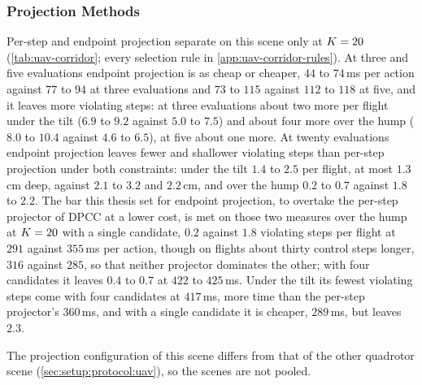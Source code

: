 \subsubsection{Projection Methods}\label{sec:res:uav:projection}
Per-step and endpoint projection separate on this scene only at $K=20$
(\autoref{tab:uav-corridor}; every selection rule in \autoref{app:uav-corridor-rules}). At three and five
evaluations endpoint projection is as cheap or cheaper, $44$ to $74$\,ms per action against $77$ to $94$ at
three evaluations and $73$ to $115$ against $112$ to $118$ at five, and it leaves more violating steps: at
three evaluations about two more per flight under the tilt ($6.9$ to $9.2$ against $5.0$ to $7.5$) and about
four more over the hump ($8.0$ to $10.4$ against $4.6$ to $6.5$), at five about one more. At twenty
evaluations endpoint projection leaves fewer and shallower violating steps than per-step projection under
both constraints: under the tilt $1.4$ to $2.5$ per flight, at most $1.3$\,cm deep, against $2.1$ to $3.2$
and $2.2$\,cm, and over the hump $0.2$ to $0.7$ against $1.8$ to $2.2$. The bar this thesis set for endpoint
projection, to overtake the per-step projector of \ac{DPCC} at a lower cost, is met on those two measures over
the hump at $K=20$ with a single candidate, $0.2$ against $1.8$ violating steps per flight at $291$
against $355$\,ms per action, though on flights about thirty control steps longer, $316$ against $285$, so that
neither projector dominates the other; with four candidates it leaves $0.4$ to $0.7$ at $422$ to $425$\,ms. Under the tilt
its fewest violating steps come with four candidates at $417$\,ms, more time than the per-step projector's
$360$\,ms, and with a single candidate it is cheaper, $289$\,ms, but leaves $2.3$.


The projection configuration of this scene differs from that of the other quadrotor scene
(\autoref{sec:setup:protocol:uav}), so the scenes are not pooled.

